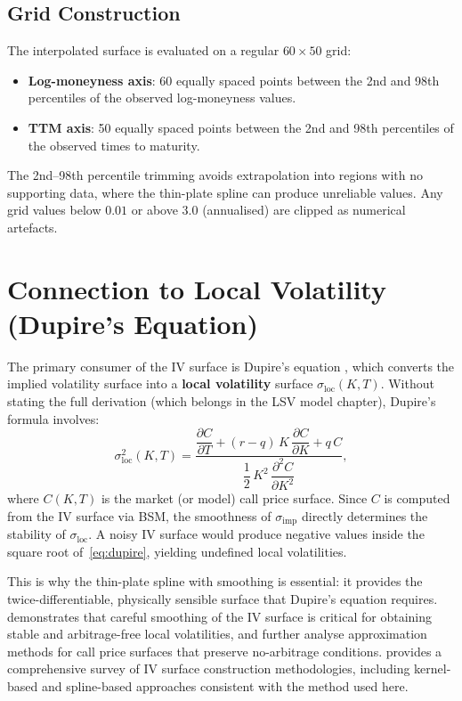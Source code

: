 \documentclass[12pt, a4paper]{article}
\begin{document}
\subsection{Grid Construction}

The interpolated surface is evaluated on a regular $60 \times 50$ grid:
\begin{itemize}[nosep]
    \item \textbf{Log-moneyness axis}: 60 equally spaced points between the
          2nd and 98th percentiles of the observed log-moneyness values.
    \item \textbf{TTM axis}: 50 equally spaced points between the 2nd and 98th
          percentiles of the observed times to maturity.
\end{itemize}

The 2nd--98th percentile trimming avoids extrapolation into regions with no
supporting data, where the thin-plate spline can produce unreliable values.
Any grid values below $0.01$ or above $3.0$ (annualised) are clipped as
numerical artefacts.

\section{Connection to Local Volatility (Dupire's Equation)}
\label{sec:dupire}

The primary consumer of the IV surface is Dupire's equation
\parencite{dupire1994pricing}, which converts the implied volatility surface
into a \textbf{local volatility} surface $\sigma_{\text{loc}}(K, T)$. Without
stating the full derivation (which belongs in the LSV model chapter), Dupire's
formula involves:
\begin{equation}
    \sigma_{\text{loc}}^2(K, T) = \frac{
        \dfrac{\partial C}{\partial T} + (r - q)\,K\,\dfrac{\partial C}{\partial K} + q\,C
    }{
        \dfrac{1}{2}\,K^2\,\dfrac{\partial^2 C}{\partial K^2}
    },
    \label{eq:dupire}
\end{equation}
where $C(K, T)$ is the market (or model) call price surface. Since $C$ is
computed from the IV surface via BSM, the smoothness of $\sigma_{\text{imp}}$
directly determines the stability of $\sigma_{\text{loc}}$. A noisy IV surface
would produce negative values inside the square root of~\eqref{eq:dupire},
yielding undefined local volatilities.

This is why the thin-plate spline with smoothing is essential: it provides
the twice-differentiable, physically sensible surface that Dupire's equation
requires. \textcite{fengler2009arbitrage} demonstrates that careful smoothing of
the IV surface is critical for obtaining stable and arbitrage-free local
volatilities, and \textcite{glaser2012arbitrage} further analyse approximation
methods for call price surfaces that preserve no-arbitrage conditions.
\textcite{homescu2011implied} provides a comprehensive survey of IV surface
construction methodologies, including kernel-based and spline-based approaches
consistent with the method used here.
\end{document}
